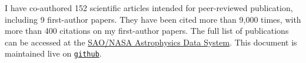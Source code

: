 I have co-authored 152 scientific articles intended for peer-reviewed 
publication, including 9 first-author papers. They have been cited more than 
9,000 times, with more than 400 citations on my 
first-author papers. The full list of publications can be accessed at the 
\href{https://goo.gl/LAu9G4}{SAO/NASA Astrophysics Data System}.
%
This document is maintained live on
\href{https://github.com/cristobal-sifon/cv/blob/master/Sifon_publications.pdf}{\texttt{github}}.

